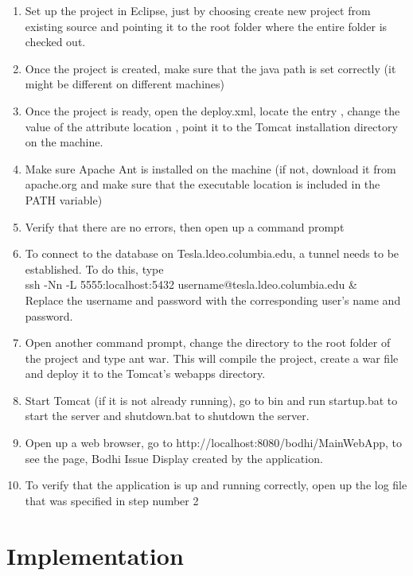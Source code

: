 \documentclass[amsart, 12pt]{article}
\begin{document}
\begin{enumerate}
\item Set up the project in Eclipse, just by choosing create new project from existing source and pointing it to the root folder where the entire folder is checked out.

\item Once the project is created, make sure that the java path is set correctly (it might be different on different machines)

\item Once the project is ready, open the deploy.xml, locate the entry , change the value of the attribute \textasciigrave location \textasciiacute, point it to the Tomcat installation directory on the machine.

\item Make sure Apache Ant is installed on the machine (if not, download it from apache.org and make sure that the executable location is included in the PATH variable)

\item Verify that there are no errors, then open up a command prompt

\item To connect to the database on Tesla.ldeo.columbia.edu, a tunnel needs to be established. To do this, type \\
ssh -Nn -L 5555:localhost:5432 username@tesla.ldeo.columbia.edu \& \\
Replace the username and password with the corresponding user's name and password.

\item Open another command prompt, change the directory to the root folder of  the project and type ant war. This will compile the project, create a war file and deploy it to the Tomcat's webapps directory.

\item Start Tomcat (if it is not already running), go to bin and run startup.bat to start the server and shutdown.bat to shutdown the server.

\item Open up a web browser, go to http://localhost:8080/bodhi/MainWebApp, to see the page, Bodhi Issue Display created by the application.

\item To verify that the application is up and running correctly, open up the log file that was specified in step number 2
\end{enumerate}


\section{Implementation}
\end{document}
